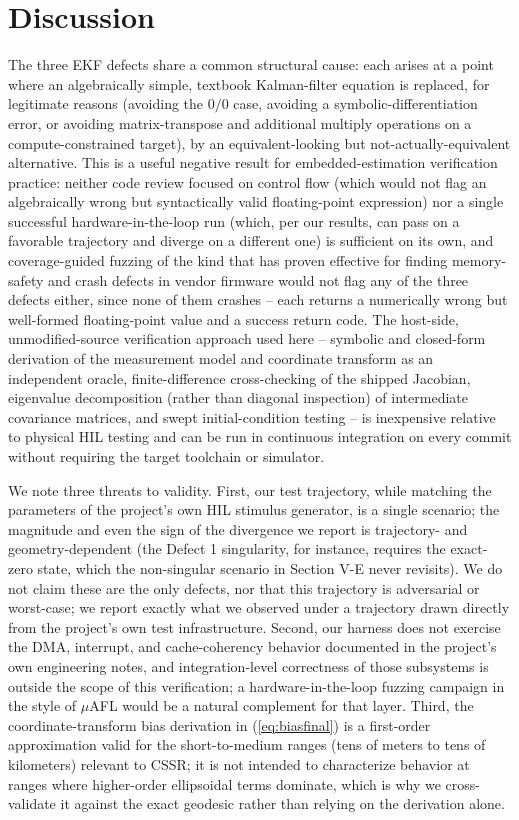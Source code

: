 \documentclass[conference]{IEEEtran}
\begin{document}
\section{Discussion}

The three EKF defects share a common structural cause: each arises at a point where an algebraically simple, textbook Kalman-filter equation is replaced, for legitimate reasons (avoiding the $0/0$ case, avoiding a symbolic-differentiation error, or avoiding matrix-transpose and additional multiply operations on a compute-constrained target), by an equivalent-looking but not-actually-equivalent alternative. This is a useful negative result for embedded-estimation verification practice: neither code review focused on control flow (which would not flag an algebraically wrong but syntactically valid floating-point expression) nor a single successful hardware-in-the-loop run (which, per our results, can pass on a favorable trajectory and diverge on a different one) is sufficient on its own, and coverage-guided fuzzing of the kind that has proven effective for finding memory-safety and crash defects in vendor firmware \cite{r19} would not flag any of the three defects either, since none of them crashes -- each returns a numerically wrong but well-formed floating-point value and a success return code. The host-side, unmodified-source verification approach used here -- symbolic and closed-form derivation of the measurement model and coordinate transform as an independent oracle, finite-difference cross-checking of the shipped Jacobian, eigenvalue decomposition (rather than diagonal inspection) of intermediate covariance matrices, and swept initial-condition testing -- is inexpensive relative to physical HIL testing and can be run in continuous integration on every commit without requiring the target toolchain or simulator.

We note three threats to validity. First, our test trajectory, while matching the parameters of the project's own HIL stimulus generator, is a single scenario; the magnitude and even the sign of the divergence we report is trajectory- and geometry-dependent (the Defect 1 singularity, for instance, requires the exact-zero state, which the non-singular scenario in Section V-E never revisits). We do not claim these are the only defects, nor that this trajectory is adversarial or worst-case; we report exactly what we observed under a trajectory drawn directly from the project's own test infrastructure. Second, our harness does not exercise the DMA, interrupt, and cache-coherency behavior documented in the project's own engineering notes, and integration-level correctness of those subsystems is outside the scope of this verification; a hardware-in-the-loop fuzzing campaign in the style of $\mu$AFL \cite{r19} would be a natural complement for that layer. Third, the coordinate-transform bias derivation in (\ref{eq:biasfinal}) is a first-order approximation valid for the short-to-medium ranges (tens of meters to tens of kilometers) relevant to CSSR; it is not intended to characterize behavior at ranges where higher-order ellipsoidal terms dominate, which is why we cross-validate it against the exact geodesic \cite{r7} rather than relying on the derivation alone.
\end{document}
